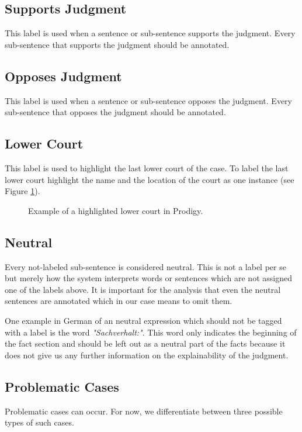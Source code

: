 \documentclass{article}
\begin{document}
\subsection{Supports Judgment}
This label is used when a sentence or sub-sentence supports the judgment. Every sub-sentence that supports the judgment should be annotated.

\subsection{Opposes Judgment}
This label is used when a sentence or sub-sentence opposes the judgment. Every sub-sentence that opposes the judgment should be annotated. 

\subsection{Lower Court}
This label is used to highlight the last lower court of the case. To label the last lower court highlight the name and the location of the court  as one instance (see Figure \ref{lower-court}).
\begin{figure}[H]
     \caption{Example of a highlighted lower court in Prodigy.}
     \label{lower-court}
\end{figure}


\subsection{Neutral}
Every not-labeled sub-sentence is considered neutral. This is not a label per se but merely how the system interprets words or sentences which are not assigned one of the labels above. It is important for the analysis that even the neutral sentences are annotated which in our case means to omit them.

One example in German of an neutral expression which should not be tagged with a label is the word \emph{"Sachverhalt:"}. This word only indicates the beginning of the fact section and should be left out as a neutral part of the facts because it does not give us any further information on the explainability of the judgment. 

\subsection{Problematic Cases}
Problematic cases can occur. For now, we differentiate between three possible types of such cases.
\end{document}
